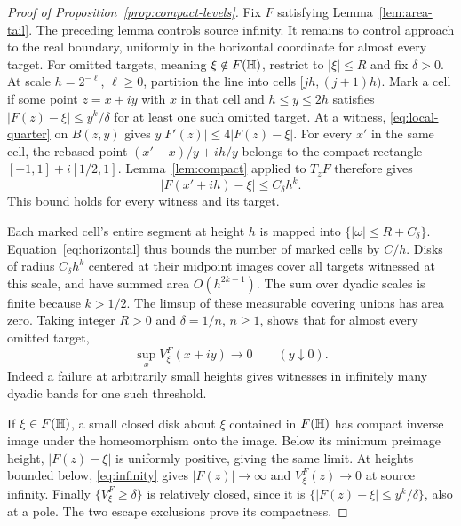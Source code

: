 \begin{proof}[Proof of Proposition~\ref{prop:compact-levels}]
Fix \(F\) satisfying Lemma~\ref{lem:area-tail}. The preceding
lemma controls source infinity. It remains to control approach to the
real boundary, uniformly in the horizontal coordinate for almost every
target.
For omitted targets, meaning \(\xi\notin F(\mathbb H)\), restrict to
\(|\xi|\le R\) and fix \(\delta>0\).
At scale \(h=2^{-\ell}\), \(\ell\ge0\), partition the line into
cells \([jh,(j+1)h)\). Mark a cell if some point \(z=x+iy\)
with \(x\) in that cell and \(h\le y\le2h\) satisfies
\(|F(z)-\xi|\le y^k/\delta\) for at least one such omitted target.
At a witness, \eqref{eq:local-quarter} on \(B(z,y)\) gives
\(y|F'(z)|\le4|F(z)-\xi|\).
For every \(x'\) in the same cell, the rebased point
\((x'-x)/y+i h/y\) belongs to the compact rectangle
\([-1,1]+i[1/2,1]\). Lemma~\ref{lem:compact} applied to \(T_zF\)
therefore gives
\begin{equation}\label{eq:cell-cover}
 |F(x'+ih)-\xi|\le C_\delta h^k.
\end{equation}
This bound holds for every witness and its target.

Each marked cell's entire segment at height \(h\) is mapped into
\(\{|\omega|\le R+C_\delta\}\).
Equation~\eqref{eq:horizontal} thus bounds the number of marked
cells by \(C/h\).
Disks of radius \(C_\delta h^k\) centered at their midpoint images
cover all targets witnessed at this scale, and have summed area
\(O(h^{2k-1})\).
The sum over dyadic scales is finite because \(k>1/2\).
The limsup of these measurable covering unions has area zero.
Taking integer \(R>0\) and \(\delta=1/n\), \(n\ge1\), shows that
for almost every omitted target,
\[
 \sup_x V_\xi^F(x+iy)\longrightarrow0\qquad(y\downarrow0).
\]
Indeed a failure at arbitrarily small heights gives witnesses
in infinitely many dyadic bands for one such threshold.

If \(\xi\in F(\mathbb H)\), a small closed disk about \(\xi\) contained
in \(F(\mathbb H)\) has compact inverse image under the homeomorphism
onto the image. Below its minimum preimage height,
\(|F(z)-\xi|\) is uniformly positive, giving the same limit.
At heights bounded below, \eqref{eq:infinity} gives
\(|F(z)|\to\infty\) and \(V_\xi^F(z)\to0\) at source infinity.
Finally \(\{V_\xi^F\ge\delta\}\) is relatively closed, since it is
\(\{|F(z)-\xi|\le y^k/\delta\}\), also at a pole.
The two escape exclusions prove its compactness.
\end{proof}
